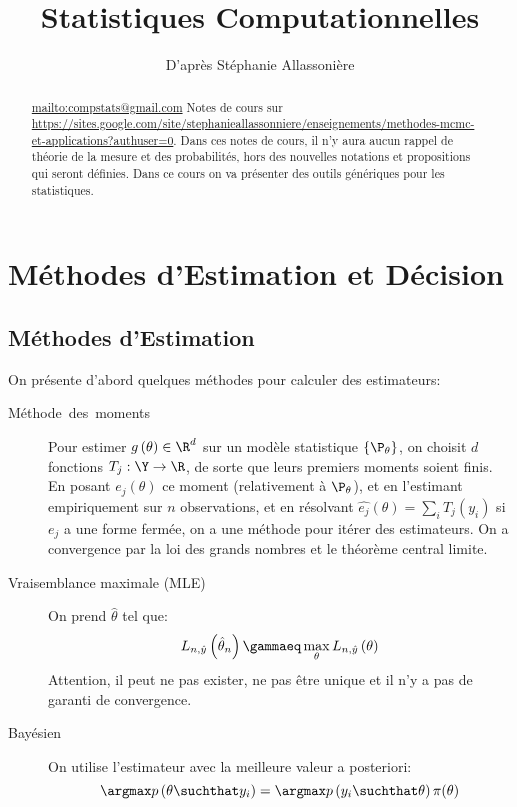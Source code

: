 \documentclass[info, math, french]{mpb-cours}
\title{Statistiques Computationnelles}
\author{D'après Stéphanie Allassonière}
\def\model#1#2{p\left(#1\suchthat#2\right)}
\def\that{\hat{\theta}}
\begin{document}
\bettertitle
\begin{abstract}
	\url{mailto:compstats@gmail.com}
	Notes de cours sur \url{https://sites.google.com/site/stephanieallassonniere/enseignements/methodes-mcmc-et-applications?authuser=0}.
	Dans ces notes de cours, il n'y aura aucun rappel de théorie de la mesure et des probabilités,
	hors des nouvelles notations et propositions qui seront définies.
	Dans ce cours on va présenter des outils génériques pour les statistiques.
\end{abstract}

\section{Méthodes d'Estimation et Décision}
\subsection{Méthodes d'Estimation}
On présente d'abord quelques méthodes pour calculer des estimateurs:
\begin{description}
	\item[Méthode~des~moments] Pour estimer $g\left(\theta\right) \in \R^{d}$ sur un modèle statistique $\left\{ \P_{\theta} \right\}$, on choisit $d$ fonctions $T_{j}: \Y \to \R$, de sorte que leurs premiers moments soient finis.
	      En posant $e_{j}(\theta)$ ce moment (relativement à $\P_{\theta}$), et en l'estimant empiriquement sur $n$ observations,
	      et en résolvant $\hat{e_{j}}\left(\theta\right) = \sum_{i} T_{j}\left(y_{i}\right)$ si $e_{j}$ a une forme fermée, on a une méthode pour itérer des estimateurs.
	      On a convergence par la loi des grands nombres et le théorème central limite.
	\item[Vraisemblance maximale (MLE)] On prend $\that$ tel que:
	      \begin{equation*}
		      L_{n, \hat{y}}\left(\that_{n}\right) \gammaeq \max_{\theta} L_{n, \hat{y}}\left(\theta\right)
	      \end{equation*}
	      Attention, il peut ne pas exister, ne pas être unique et il n'y a pas de garanti de convergence.
	\item[Bayésien] On utilise l'estimateur avec la meilleure valeur a posteriori:
	      \begin{equation*}
		      \argmax \model{\theta}{y_{i}} = \argmax \model{y_{i}}{\theta}\pi(\theta)
	      \end{equation*}
\end{description}
\end{document}
